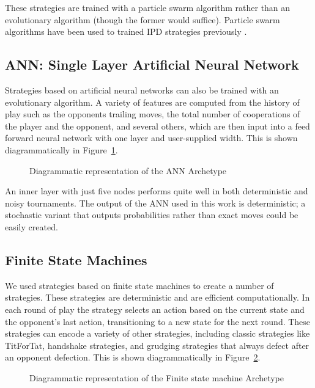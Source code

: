\documentclass{article}
\begin{document}
These strategies are trained with a particle swarm algorithm rather than an
evolutionary algorithm (though the former would suffice). Particle swarm
algorithms have been used to trained IPD strategies previously
\cite{franken2005particle}.

\subsection{ANN: Single Layer Artificial Neural Network}

Strategies based on artificial neural networks can also be trained with an
evolutionary algorithm. A variety of features are computed from the history
of play such as the opponents trailing moves, the total number of cooperations
of the player and the opponent, and several others, which are then input
into a feed forward neural network with one layer and user-supplied width.
This is shown diagrammatically in Figure~\ref{fig:ann}.

\begin{figure}[!hbtp]
    \centering
    
    \caption{Diagrammatic representation of the ANN Archetype}
    \label{fig:ann}
\end{figure}


An inner layer with just five nodes performs quite well in both deterministic and
noisy tournaments. The output of the ANN used in this work is deterministic;
a stochastic variant that outputs probabilities rather than exact moves could
be easily created.

\subsection{Finite State Machines}

We used strategies based on finite state machines to create a number of
strategies. These strategies are deterministic and are efficient computationally.
In each round of play the strategy selects an action based on the current state
and the opponent's last action, transitioning to a new state for the next round.
These strategies can encode a variety
of other strategies, including classic strategies like TitForTat,
handshake strategies, and grudging strategies that always defect after
an opponent defection.
This is shown diagrammatically in Figure~\ref{fig:fsm}.

\begin{figure}[!hbtp]
    \centering
    
    \caption{Diagrammatic representation of the Finite state machine Archetype}
    \label{fig:fsm}
\end{figure}
\end{document}
